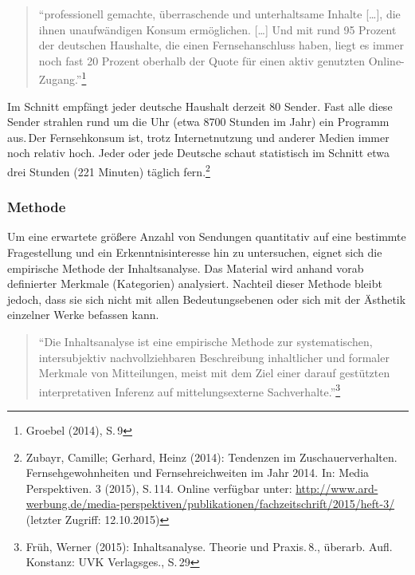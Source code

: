 \begin{flushleft}
\begin{quote}
\enquote{professionell gemachte, überraschende und unterhaltsame Inhalte
{[}\ldots{}{]}, die ihnen unaufwändigen Konsum ermöglichen.
{[}\ldots{}{]} Und mit rund 95 Prozent der deutschen Haushalte, die
einen Fernsehanschluss haben, liegt es immer noch fast 20 Prozent
oberhalb der Quote für einen aktiv genutzten Online-Zugang.}\footnote{Groebel
  (2014), S.\,9}
\end{quote}
\end{flushleft}

Im Schnitt empfängt jeder deutsche Haushalt derzeit 80 Sender. Fast alle
diese Sender strahlen rund um die Uhr (etwa 8700 Stunden im Jahr) ein
Programm aus.\,Der Fernsehkonsum ist, trotz Internetnutzung und anderer
Medien immer noch relativ hoch. Jeder oder jede Deutsche schaut
statistisch im Schnitt etwa drei Stunden (221 Minuten) täglich
fern.\footnote{Zubayr, Camille; Gerhard, Heinz (2014): Tendenzen im
  Zuschauerverhalten. Fernsehgewohnheiten und Fernsehreichweiten im Jahr
  2014. In: Media Perspektiven. 3 (2015), S.\,114. Online verfügbar
  unter:
  \url{http://www.ard-werbung.de/media-perspektiven/publikationen/fachzeitschrift/2015/heft-3/}
  (letzter Zugriff: 12.10.2015)}

\subsubsection{Methode}\label{methode}

Um eine erwartete größere Anzahl von Sendungen quantitativ auf eine
bestimmte Fragestellung und ein Erkenntnisinteresse hin zu untersuchen,
eignet sich die empirische Methode der Inhaltsanalyse. Das Material wird
anhand vorab definierter Merkmale (Kategorien) analysiert. Nachteil
dieser Methode bleibt jedoch, dass sie sich nicht mit allen
Bedeutungsebenen oder sich mit der Ästhetik einzelner Werke befassen
kann.

\begin{flushleft}
\begin{quote}
\enquote{Die Inhaltsanalyse ist eine empirische Methode zur
systematischen, intersubjektiv nachvollziehbaren Beschreibung
inhaltlicher und formaler Merkmale von Mitteilungen, meist mit dem Ziel
einer darauf gestützten interpretativen Inferenz auf mittelungsexterne
Sachverhalte.}\footnote{Früh, Werner (2015): Inhaltsanalyse. Theorie und
  Praxis.\,8., überarb. Aufl. Konstanz: UVK Verlagsges., S.\,29}
\end{quote}
\end{flushleft}

